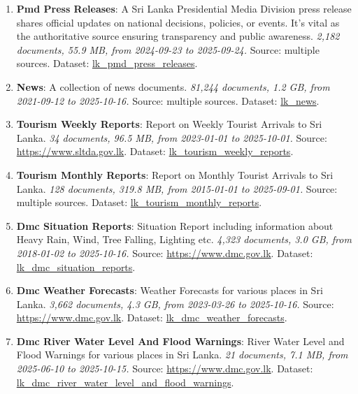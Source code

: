 \documentclass[10pt,a4paper]{article}%
\begin{document}
\begin{enumerate}
\item%
\textbf{Pmd Press Releases}: A Sri Lanka Presidential Media Division press release shares official updates on national decisions, policies, or events. It’s vital as the authoritative source ensuring transparency and public awareness.\textit{ 2,182 documents, 55.9 MB, from 2024{-}09{-}23 to 2025{-}09{-}24.} Source: multiple sources. Dataset: \href{https://github.com/nuuuwan/lk\_pmd/tree/data\_lk\_pmd\_press\_releases/data/lk\_pmd\_press\_releases}{lk\_pmd\_press\_releases}.%
\item%
\textbf{News}: A collection of news documents.\textit{ 81,244 documents, 1.2 GB, from 2021{-}09{-}12 to 2025{-}10{-}16.} Source: multiple sources. Dataset: \href{https://github.com/nuuuwan/lk\_news/tree/data/data/lk\_news}{lk\_news}.%
\item%
\textbf{Tourism Weekly Reports}: Report on Weekly Tourist Arrivals to Sri Lanka.\textit{ 34 documents, 96.5 MB, from 2023{-}01{-}01 to 2025{-}10{-}01.} Source: \href{https://www.sltda.gov.lk}{https://www.sltda.gov.lk}. Dataset: \href{https://github.com/nuuuwan/lk\_tourism/tree/data\_lk\_tourism\_weekly\_reports/data/lk\_tourism\_weekly\_reports}{lk\_tourism\_weekly\_reports}.%
\item%
\textbf{Tourism Monthly Reports}: Report on Monthly Tourist Arrivals to Sri Lanka.\textit{ 128 documents, 319.8 MB, from 2015{-}01{-}01 to 2025{-}09{-}01.} Source: multiple sources. Dataset: \href{https://github.com/nuuuwan/lk\_tourism/tree/data\_lk\_tourism\_monthly\_reports/data/lk\_tourism\_monthly\_reports}{lk\_tourism\_monthly\_reports}.%
\item%
\textbf{Dmc Situation Reports}: Situation Report including information about Heavy Rain, Wind, Tree Falling, Lighting etc.\textit{ 4,323 documents, 3.0 GB, from 2018{-}01{-}02 to 2025{-}10{-}16.} Source: \href{https://www.dmc.gov.lk}{https://www.dmc.gov.lk}. Dataset: \href{https://github.com/nuuuwan/lk\_dmc/tree/data\_lk\_dmc\_situation\_reports/data/lk\_dmc\_situation\_reports}{lk\_dmc\_situation\_reports}.%
\item%
\textbf{Dmc Weather Forecasts}: Weather Forecasts for various places in Sri Lanka.\textit{ 3,662 documents, 4.3 GB, from 2023{-}03{-}26 to 2025{-}10{-}16.} Source: \href{https://www.dmc.gov.lk}{https://www.dmc.gov.lk}. Dataset: \href{https://github.com/nuuuwan/lk\_dmc/tree/data\_lk\_dmc\_weather\_forecasts/data/lk\_dmc\_weather\_forecasts}{lk\_dmc\_weather\_forecasts}.%
\item%
\textbf{Dmc River Water Level And Flood Warnings}: River Water Level and Flood Warnings for various places in Sri Lanka.\textit{ 21 documents, 7.1 MB, from 2025{-}06{-}10 to 2025{-}10{-}15.} Source: \href{https://www.dmc.gov.lk}{https://www.dmc.gov.lk}. Dataset: \href{https://github.com/nuuuwan/lk\_dmc/tree/data\_lk\_dmc\_river\_water\_level\_and\_flood\_warnings/data/lk\_dmc\_river\_water\_level\_and\_flood\_warnings}{lk\_dmc\_river\_water\_level\_and\_flood\_warnings}.%

\end{enumerate}
\end{document}
